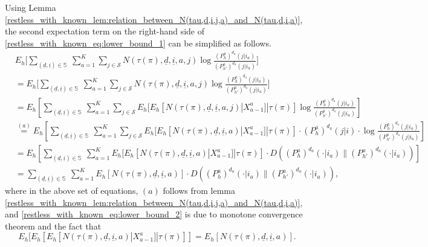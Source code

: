 Using Lemma \ref{restless_with_known_lem:relation_between_N(tau,d,i,j,a)_and_N(tau,d,i,a)}, the second expectation term on the right-hand side of \eqref{restless_with_known_eq:lower_bound_1} can be simplified as follows.
\begingroup \allowdisplaybreaks\begin{align}
	& E_h\bigg[\sum\limits_{(\underline{d},\underline{i})\in\mathbb{S}}~\sum\limits_{a=1}^{K}\sum\limits_{j\in\mathcal{S}}N(\tau(\pi),\underline{d},\underline{i},a,j)\log\frac{(P_h^{a})^{d_a}(j|i_a)}{(P_{h'}^{a})^{d_a}(j|i_a)}\bigg]\nonumber\\
	&=E_h\bigg[\sum\limits_{(\underline{d},\underline{i})\in\mathbb{S}}~\sum\limits_{a=1}^{K}\sum\limits_{j\in\mathcal{S}}N(\tau(\pi),\underline{d},\underline{i},a,j)\log\frac{(P_h^{a})^{d_a}(j|i_a)}{(P_{h'}^{a})^{d_a}(j|i_a)}\bigg]\nonumber\\
 &=E_h\left[\sum\limits_{(\underline{d},\underline{i})\in\mathbb{S}}~\sum\limits_{a=1}^{K}\sum\limits_{j\in\mathcal{S}}E_h[E_h[N(\tau(\pi),\underline{d},\underline{i},a,j)|X_{a-1}^a]|\tau(\pi)]\log\frac{(P_h^{a})^{d_a}(j|i_a)}{(P_{h'}^{a})^{d_a}(j|i_a)}\right]\nonumber\\
 &\stackrel{(a)}{=} E_h\left[\sum\limits_{(\underline{d},\underline{i})\in\mathbb{S}}~\sum\limits_{a=1}^{K}\sum\limits_{j\in\mathcal{S}}E_h[E_h[N(\tau(\pi),\underline{d},\underline{i},a)|X_{a-1}^a]|\tau(\pi)]\cdot (P_h^a)^{d_a}(j|i)\cdot\log\frac{(P_h^{a})^{d_a}(j|i_a)}{(P_{h'}^{a})^{d_a}(j|i_a)}\right]\nonumber\\
 &= E_h\left[\sum\limits_{(\underline{d},\underline{i})\in\mathbb{S}}~\sum\limits_{a=1}^{K}E_h[E_h[N(\tau(\pi),\underline{d},\underline{i},a)|X_{a-1}^a]|\tau(\pi)]\cdot D((P_h^a)^{d_a}(\cdot|i_a)\|(P_{h'}^a)^{d_a}(\cdot|i_a))\right]\nonumber\\
 &=\sum\limits_{(\underline{d},\underline{i})\in\mathbb{S}}~\sum\limits_{a=1}^{K}E_h[N(\tau(\pi),\underline{d},\underline{i},a)]\cdot D((P_h^a)^{d_a}(\cdot|i_a)\|(P_{h'}^a)^{d_a}(\cdot|i_a)),\label{restless_with_known_eq:lower_bound_2}
\end{align}\endgroup
where in the above set of equations, $(a)$ follows from lemma \ref{restless_with_known_lem:relation_between_N(tau,d,i,j,a)_and_N(tau,d,i,a)},
and \eqref{restless_with_known_eq:lower_bound_2} is due to monotone convergence theorem and the fact that $$E_h[E_h[E_h[N(\tau(\pi),\underline{d},\underline{i},a)|X_{a-1}^a]|\tau(\pi)]]=E_h[N(\tau(\pi),\underline{d},\underline{i},a)].$$

